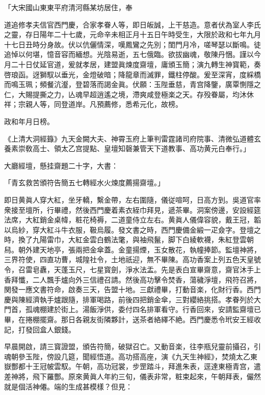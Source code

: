 \begin{myquote}[\markfont]
「大宋國山東東平府清河縣某坊居住，奉

道追修孝夫信官西門慶，合家孝眷人等，即日皈誠，上干慈造。意者伏為室人李氏之靈，存日陽年二十七歲，元命辛未相正月十五日午時受生，大限於政和七年九月十七日丑時分身故。伏以伉儷情深，嘆鳳鸞之先別；閨門月冷，嗟琴瑟以斷鳴。徒追悼以何堪，憶音容而緬想。光陰易逝，五七俄臨。欲拔幽魂，敬陳丹悃。謹以今月二十日仗延官道，爰就孝居，建盟眞煉度齋壇，庸頒玉簡；演九轉生神寳範，奏啓琅函。迓獅馭以垂光，金燈破暗；降龍章而滅罪，鐵柱停酸。爰至深宵，度綵橋而鳴玉珮；頻餐沆瀣，登碧落而謁金眞。伏願：玉陛垂慈，青宫降鑒，廣覃惻隱之仁，大賜提撕之力，亾魂早超逍遙之境，滯爽咸登極楽之天。存殁眷屬，均沐休祥；宗親人等，同登道岸。凡預薦修，悉希元化，故榜。　

政和年月日榜。

《上清大洞經籙》九天金闕大夫、神霄玉府上筆判雷霆諸司府院事、清微弘道體玄養素崇敎高士、領太乙宫提點、皇壇知磬兼管天下道教事、高功黄元白奉行。」
\end{myquote}

大廳經壇，懸挂齋題二十字，大書：

\begin{myquote}[\markfont]
「青玄救苦頒符告簡五七轉經水火煉度薦揚齋壇。」
\end{myquote}

即日黄眞人穿大紅，坐牙轎，繫金帶，左右圍隨，儀従喧呵，日高方到。吳道官率衆接至壇所，行畢禮，然後西門慶着素衣絰巾拜見，遞茶畢。洞案傍邊，安設經筵法席，大紅銷金桌幃，粧花椅褥，二道童侍立左右。黄眞人儀偉容貌，戴王冠，韜以烏紗，穿大紅斗牛衣服，靸烏履。發文書之時，西門慶備金緞一疋僉字。登壇之時，換了九陽雷巾，大紅金雲白鶴法氅，與袖飛鬣，脚下白綾軟襪，朱紅登雲朝舄。朝外建天地亭，張兩把金傘蓋。金童揚煙，玉女散花，執幢捧節。監壇神將，三界符使，四直功曹，城隍社令，土地祇迎，無不畢陳。高功香案上列五色天皇號令，召雷皂纛，天蓬玉尺，七星寳劍，淨水法盂。先是表白宣畢齋意，齋官沐手上香拜懺，二人飄手爐向外三信禮召請。然後高功擊令焚香，蕩穢淨壇，飛符召將，関發一應文書符命，啟奏三天，告盟十地。三獻禮畢，打動音楽，化財行香。西門慶與陳經濟執手爐跟隨，排軍喝路，前後四把銷金傘，三對纓絡挑搭。孝眷列於大門首，孤魂棚建於街上。湯飯淨供，委付四名排軍看守。行香回來，安請監齋壇已畢，在捲棚擺齋。那日各親友街隣夥計，送茶者絡繹不絶。西門慶悉令玳安王經收記，打發回盒人銀錢。

早晨開啟，請三寳證盟，頒告符簡，破獄召亡。又動音楽，往李瓶兒靈前攝召，引魂朝參玉陛，傍設几筵，聞經悟道。高功搭高座，演《九天生神經》，焚燒太乙東嶽酆都十王冠帔雲馭。午朝，高功冠裳，步罡踏斗，拜進朱表，逕達東極青宫，遣差神將，飛下羅酆。原來黄眞人年約三旬，儀表非常，粧束起來，午朝拜表，儼然就是個活神僊。端的生成甚模樣？但見：

